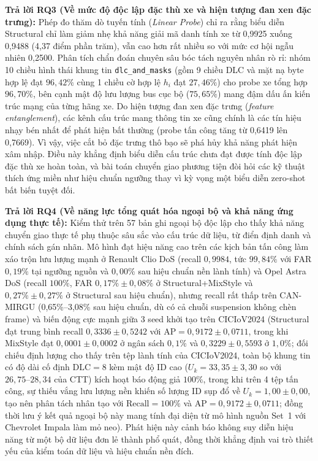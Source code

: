 \documentclass[12pt, a4paper, reqno, oneside]{book}
\DeclareRobustCommand{\code}[1]{\nolinkurl{#1}}
\begin{document}
\textbf{Trả lời RQ3 (Về mức độ độc lập đặc thù xe và hiện tượng đan xen đặc trưng):}
Phép đo thăm dò tuyến tính (\textit{Linear Probe}) chỉ ra rằng biểu diễn Structural chỉ làm giảm nhẹ khả năng giải mã danh tính xe từ 0,9925 xuống 0,9488 (4,37 điểm phần trăm), vẫn cao hơn rất nhiều so với mức cơ hội ngẫu nhiên 0,2500. Phân tích chẩn đoán chuyên sâu bóc tách nguyên nhân rò rỉ: nhóm 10 chiều hình thái khung tin \code{dlc\_and\_masks} (gồm 9 chiều DLC và mặt nạ byte hợp lệ đạt $96{,}42\%$ cùng 1 chiều cờ hợp lệ $h_i$ đạt $27{,}46\%$) cho probe xe tổng hợp $96{,}70\%$, bên cạnh mật độ lưu lượng bus cục bộ ($75{,}65\%$) mang đậm dấu ấn kiến trúc mạng của từng hãng xe. Do hiện tượng đan xen đặc trưng (\textit{feature entanglement}), các kênh cấu trúc mang thông tin xe cũng chính là các tín hiệu nhạy bén nhất để phát hiện bất thường (probe tấn công tăng từ 0,6419 lên 0,7669). Vì vậy, việc cắt bỏ đặc trưng thô bạo sẽ phá hủy khả năng phát hiện xâm nhập. Điều này khẳng định biểu diễn cấu trúc chưa đạt được tính độc lập đặc thù xe hoàn toàn, và bài toán chuyển giao phương tiện đòi hỏi các kỹ thuật thích ứng miền như hiệu chuẩn ngưỡng thay vì kỳ vọng một biểu diễn zero-shot bất biến tuyệt đối.

\textbf{Trả lời RQ4 (Về năng lực tổng quát hóa ngoại bộ và khả năng ứng dụng thực tế):}
Kiểm thử trên 57 bản ghi ngoại bộ độc lập cho thấy khả năng chuyển giao thực tế phụ thuộc sâu sắc vào cấu trúc dữ liệu, từ điển định danh và chính sách gán nhãn. Mô hình đạt hiệu năng cao trên các kịch bản tấn công làm xáo trộn lưu lượng mạnh ở Renault Clio DoS (recall $0{,}9984$, tức $99{,}84\%$ với FAR $0{,}19\%$ tại ngưỡng nguồn và $0{,}00\%$ sau hiệu chuẩn nền lành tính) và Opel Astra DoS (recall $100\%$, FAR $0{,}17\% \pm 0{,}08\%$ ở Structural+MixStyle và $0{,}27\% \pm 0{,}27\%$ ở Structural sau hiệu chuẩn), nhưng recall rất thấp trên CAN-MIRGU (0,65\%--3,08\% sau hiệu chuẩn, dù có cả chuỗi suspension không chèn frame) và biến động cực mạnh giữa 3 seed khởi tạo trên CICIoV2024 (Structural đạt trung bình recall $0{,}3336 \pm 0{,}5242$ với $\text{AP}=0{,}9172 \pm 0{,}0711$, trong khi MixStyle đạt $0{,}0001 \pm 0{,}0002$ ở ngân sách $0{,}1\%$ và $0{,}3229 \pm 0{,}5593$ ở $1{,}0\%$; đối chiếu định lượng cho thấy trên tệp lành tính của CICIoV2024, toàn bộ khung tin có độ dài cố định $\text{DLC}=8$ kèm mật độ ID cao ($U_k = 33{,}35 \pm 3{,}30$ so với $26{,}75\text{--}28{,}34$ của CTT) kích hoạt báo động giả $100\%$, trong khi trên 4 tệp tấn công, sự thiếu vắng lưu lượng nền khiến số lượng ID sụp đổ về $U_k = 1{,}00 \pm 0{,}00$, tạo nên phân tách nhân tạo với $\text{Recall}=100\%$ và $\text{AP}=0{,}9172 \pm 0{,}0711$; đồng thời lưu ý kết quả ngoại bộ này mang tính đại diện từ mô hình nguồn Set~1 với Chevrolet Impala làm mỏ neo). Phát hiện này cảnh báo không suy diễn hiệu năng từ một bộ dữ liệu đơn lẻ thành phổ quát, đồng thời khẳng định vai trò thiết yếu của kiểm toán dữ liệu và hiệu chuẩn nền đích.
\end{document}
